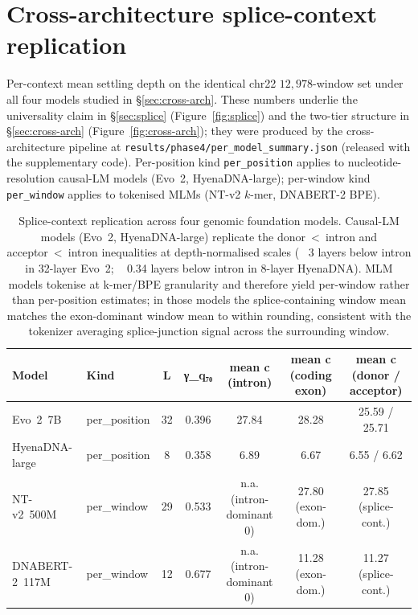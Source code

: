 \documentclass[12pt]{article}
\theoremstyle{plain}
\theoremstyle{definition}
\theoremstyle{remark}
\begin{document}
\section{Cross-architecture splice-context replication}
\label{app:cross-arch}

Per-context mean settling depth on the identical chr22
$12{,}978$-window set under all four models studied in
\S\ref{sec:cross-arch}. These numbers underlie the universality claim
in \S\ref{sec:splice} (Figure~\ref{fig:splice}) and the two-tier
structure in \S\ref{sec:cross-arch} (Figure~\ref{fig:cross-arch}); they
were produced by the cross-architecture pipeline at
\texttt{results/phase4/per\_model\_summary.json} (released with the
supplementary code). Per-position kind \texttt{per\_position} applies
to nucleotide-resolution causal-LM models (Evo~2, HyenaDNA-large);
per-window kind \texttt{per\_window} applies to tokenised MLMs
(NT-v2 $k$-mer, DNABERT-2 BPE).

\begin{table}[h]
\caption{Splice-context replication across four genomic foundation
models. Causal-LM models (Evo~2, HyenaDNA-large) replicate the
donor~<~intron and acceptor~<~intron inequalities at
depth-normalised scales (~ 3 layers below intron in 32-layer
Evo~2; ~ 0.34 layers below intron in 8-layer HyenaDNA). MLM
models tokenise at k-mer/BPE granularity and therefore yield
per-window rather than per-position estimates; in those models the
splice-containing window mean matches the exon-dominant window mean to
within rounding, consistent with the tokenizer averaging splice-junction
signal across the surrounding window.}
\label{tab:cross-arch-context}
\centering
\footnotesize
\setlength{\tabcolsep}{4pt}
\begin{tabular}{@{}llccccc@{}}
\toprule
Model & Kind & L & γ\_q₇₀
   & mean c (intron) & mean c (coding exon)
   & mean c (donor / acceptor) \\
\midrule
Evo~2~7B            & per\_position & 32 & 0.396
   & 27.84 & 28.28 & 25.59 / 25.71 \\
HyenaDNA-large      & per\_position & 8  & 0.358
   & 6.89 & 6.67
   & 6.55 / 6.62 \\
NT-v2~500M          & per\_window   & 29 & 0.533
   & n.a. (intron-dominant 0)
   & 27.80 (exon-dom.) & 27.85 (splice-cont.) \\
DNABERT-2~117M      & per\_window   & 12 & 0.677
   & n.a. (intron-dominant 0)
   & 11.28 (exon-dom.) & 11.27 (splice-cont.) \\
\bottomrule
\end{tabular}
\end{table}
\end{document}
